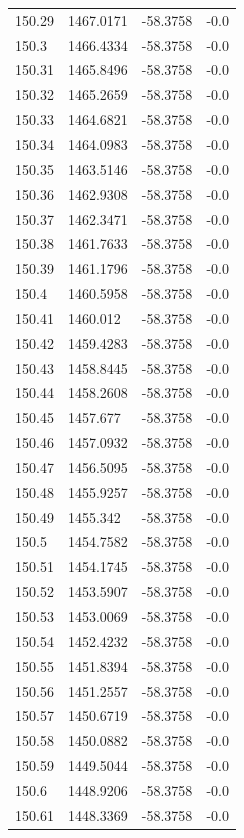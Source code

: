 \begin{table}[H]
\begin{tabular}{llll}
150.29 & 1467.0171 & -58.3758 & -0.0 \\
150.3 & 1466.4334 & -58.3758 & -0.0 \\
150.31 & 1465.8496 & -58.3758 & -0.0 \\
150.32 & 1465.2659 & -58.3758 & -0.0 \\
150.33 & 1464.6821 & -58.3758 & -0.0 \\
150.34 & 1464.0983 & -58.3758 & -0.0 \\
150.35 & 1463.5146 & -58.3758 & -0.0 \\
150.36 & 1462.9308 & -58.3758 & -0.0 \\
150.37 & 1462.3471 & -58.3758 & -0.0 \\
150.38 & 1461.7633 & -58.3758 & -0.0 \\
150.39 & 1461.1796 & -58.3758 & -0.0 \\
150.4 & 1460.5958 & -58.3758 & -0.0 \\
150.41 & 1460.012 & -58.3758 & -0.0 \\
150.42 & 1459.4283 & -58.3758 & -0.0 \\
150.43 & 1458.8445 & -58.3758 & -0.0 \\
150.44 & 1458.2608 & -58.3758 & -0.0 \\
150.45 & 1457.677 & -58.3758 & -0.0 \\
150.46 & 1457.0932 & -58.3758 & -0.0 \\
150.47 & 1456.5095 & -58.3758 & -0.0 \\
150.48 & 1455.9257 & -58.3758 & -0.0 \\
150.49 & 1455.342 & -58.3758 & -0.0 \\
150.5 & 1454.7582 & -58.3758 & -0.0 \\
150.51 & 1454.1745 & -58.3758 & -0.0 \\
150.52 & 1453.5907 & -58.3758 & -0.0 \\
150.53 & 1453.0069 & -58.3758 & -0.0 \\
150.54 & 1452.4232 & -58.3758 & -0.0 \\
150.55 & 1451.8394 & -58.3758 & -0.0 \\
150.56 & 1451.2557 & -58.3758 & -0.0 \\
150.57 & 1450.6719 & -58.3758 & -0.0 \\
150.58 & 1450.0882 & -58.3758 & -0.0 \\
150.59 & 1449.5044 & -58.3758 & -0.0 \\
150.6 & 1448.9206 & -58.3758 & -0.0 \\
150.61 & 1448.3369 & -58.3758 & -0.0 \\

\end{tabular}
\end{table}

